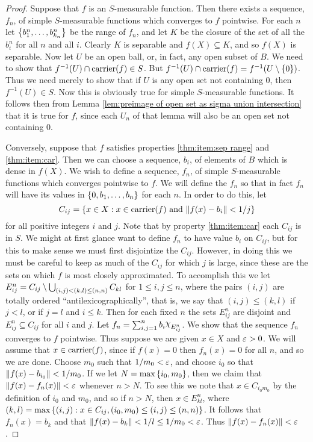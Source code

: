 \begin{proof}
Suppose that $f$ is an $S$-measurable function. Then there exists a sequence, $f_n$, of simple $S$-measurable functions which converges to $f$ pointwise. For each $n$ let $\left\{b_1^n,\dots,b_{k_n}^n\right\}$ be the range of $f_n$, and let $K$ be the closure of the set of all the $b_i^n$ for all $n$ and all $i$. Clearly $K$ is separable and $f(X)\subseteq K$, and so $f(X)$ is separable. Now let $U$ be an open ball, or, in fact, any open subset of $B$. We need to show that $f^{-1}(U)\cap\operatorname{carrier}(f)\in S$. But $f^{-1}(U)\cap\operatorname{carrier}(f)=f^{-1}(U\setminus\left\{0\right\})$. Thus we need merely to show that if $U$ is any open set not containing 0, then $f^{-1}(U)\in S$. Now this is obviously true for simple $S$-measurable functions. It follows then from Lemma \ref{lem:preimage of open set as sigma union intersection} that it is true for $f$, since each $U_n$ of that lemma will also be an open set not containing 0.

Conversely, suppose that $f$ satisfies properties \ref{thm:item:sep range} and \ref{thm:item:car}. Then we can choose a sequence, $b_i$, of elements of $B$ which is dense in $f(X)$. We wish to define a sequence, $f_n$, of simple $S$-measurable functions which converges pointwise to $f$. We will define the $f_n$ so that in fact $f_n$ will have its values in $\left\{0,b_1,\dots,b_n\right\}$ for each $n$. In order to do this, let \[C_{ij}=\left\{x\in X:x\in\operatorname{carrier}(f)\text{ and }\norm{f(x)-b_i}<1/j\right\}\] for all positive integers $i$ and $j$. Note that by property \ref{thm:item:car} each $C_{ij}$ is in $S$. We might at first glance want to define $f_n$ to have value $b_i$ on $C_{ij}$, but for this to make sense we must first disjointize the $C_{ij}$. However, in doing this we must be careful to keep as much of the $C_{ij}$ for which $j$ is large, since these are the sets on which $f$ is most closely approximated. To accomplish this we let $E_{i j}^n=C_{ij}\setminus\bigcup_{(i,j)<(k,l)\leq(n,n)}C_{kl}$ for $1\leq i,j\leq n$, where the pairs $(i,j)$ are totally ordered ``antilexicographically'', that is, we say that $(i,j)\leq(k,l)$ if $j<l$, or if $j=l$ and $i\leq k$. Then for each fixed $n$ the sets $E_{i j}^n$ are disjoint and $E_{ij}^n\subseteq C_{ij}$ for all $i$ and $j$. Let $f_n=\sum_{i,j=1}^nb_i\idf{E_{ij}^n}$. We show that the sequence $f_n$ converges to $f$ pointwise. Thus suppose we are given $x\in X$ and $\varepsilon>0$. We will assume that $x\in\operatorname{carrier}(f)$, since if $f(x)=0$ then $f_n(x)=0$ for all $n$, and so we are done. Choose $m_0$ such that $1/m_0<\varepsilon$, and choose $i_0$ so that $\norm{f(x)-b_{i_0}}<1/m_0$. If we let $N=\max\left\{i_0, m_0\right\}$, then we claim that $\norm{f(x)-f_n(x)}<\varepsilon$ whenever $n>N$. To see this we note that $x\in C_{i_0m_0}$ by the definition of $i_0$ and $m_0$, and so if $n>N$, then $x\in E^n_{kl}$, where $(k,l)=\max\left\{(i,j):x\in C_{ij},(i_0,m_0)\leq(i,j)\leq(n, n)\right\}$. It follows that $f_n(x)=b_k$ and that $\norm{f(x)-b_k}<1/l\leq 1/m_0<\varepsilon$. Thus $\norm{f(x)-f_n(x)}<\varepsilon$.
\end{proof}

